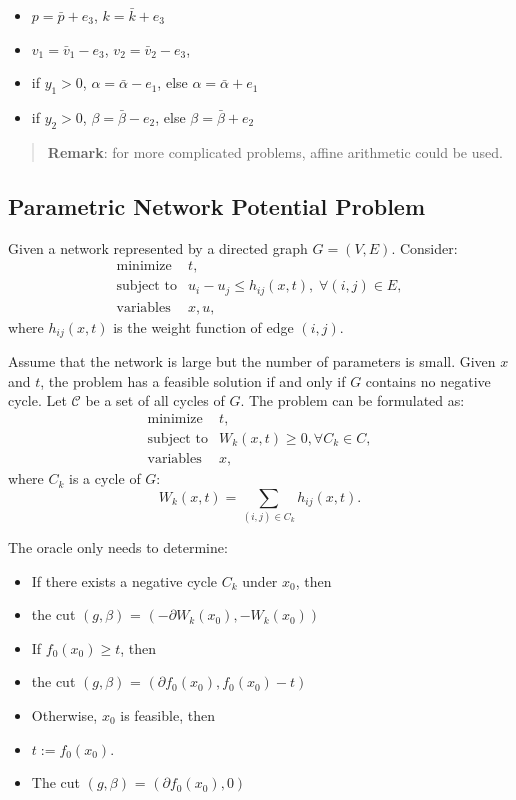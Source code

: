 \documentclass[final,leqno]{siamltex}
\providecommand{\tightlist}{%
  \setlength{\itemsep}{0pt}\setlength{\parskip}{0pt}}
\begin{document}
\begin{itemize}
\tightlist
\item
  \(p = \bar{p} + e_3\), \(k = \bar{k} + e_3\)
\item
  \(v_1 = \bar{v}_1 - e_3\), \(v_2 = \bar{v}_2 - e_3\),
\item
  if \(y_1 > 0\), \(\alpha = \bar{\alpha} - e_1\), else
  \(\alpha = \bar{\alpha} + e_1\)
\item
  if \(y_2 > 0\), \(\beta = \bar{\beta} - e_2\), else
  \(\beta = \bar{\beta} + e_2\)
\end{itemize}

\begin{quote}
\textbf{Remark}: for more complicated problems, affine arithmetic could be
used.
\end{quote}

\hypertarget{sec:parametric-network-potential-problem}{%
\subsection{Parametric Network Potential Problem}\label{sec:parametric-network-potential-problem}}

Given a network represented by a directed graph \(G = (V, E)\).
Consider:
\[\begin{array}{ll}
    \text{minimize} & t, \\
    \text{subject to} & u_i - u_j \le h_{ij}(x, t), \; \forall (i, j) \in E,\\
    \text{variables} &x, u,
  \end{array}
\]
where \(h_{ij}(x, t)\) is the weight function of edge \((i,j)\).

Assume that the network is large but the number of parameters is small.
Given \(x\) and \(t\), the problem has a feasible solution if and only if \(G\) contains no negative cycle.
Let \(\mathcal{C}\) be a set of all cycles of \(G\). The problem can be formulated as:
\[\begin{array}{ll}
    \text{minimize} & t, \\
    \text{subject to} & W_k(x, t) \ge 0, \forall C_k \in C ,\\
       \text{variables} & x,
\end{array}
\]
where \(C_k\) is a cycle of \(G\):
\[W_k(x, t) = \sum_{ (i,j)\in C_k} h_{ij}(x, t).
\]

The oracle only needs to determine:

\begin{itemize}
\tightlist
\item
  If there exists a negative cycle \(C_k\) under \(x_0\), then
\item
  the cut \((g, \beta)\) = \((-\partial W_k(x_0), -W_k(x_0))\)
\item
  If \(f_0(x_0) \geq t\), then
\item
  the cut \((g, \beta)\) = \((\partial f_0(x_0), f_0(x_0) - t)\)
\item
  Otherwise, \(x_0\) is feasible, then
\item
  \(t := f_0(x_0)\).
\item
  The cut \((g, \beta)\) = \((\partial f_0(x_0), 0)\)
\end{itemize}
\end{document}
